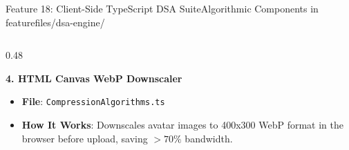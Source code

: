\documentclass[aspectratio=169,10pt]{beamer}
\begin{document}
\begin{frame}[t]{Feature 18: Client-Side TypeScript DSA Suite}{Algorithmic Components in featurefiles/dsa-engine/}
\begin{columns}[t]
\begin{column}{0.48\textwidth}
\begin{itemize}
      \end{itemize}
      \vspace{0.2cm}
      {\fontsize{9.0}{11.0}\selectfont\textbf{\textcolor{KoinexaOrange}{4. HTML Canvas WebP Downscaler}}}\par\vspace{1.5pt}
      \begin{itemize}\setlength{\itemsep}{1.2pt}
        \item {\fontsize{8.0}{9.8}\selectfont \textbf{File}: \texttt{CompressionAlgorithms.ts}}
        \item {\fontsize{8.0}{9.8}\selectfont \textbf{How It Works}: Downscales avatar images to 400x300 WebP format in the browser before upload, saving $> 70\%$ bandwidth.}
      \end{itemize}
    \end{column}
  \end{columns}
\end{frame}
\end{document}
